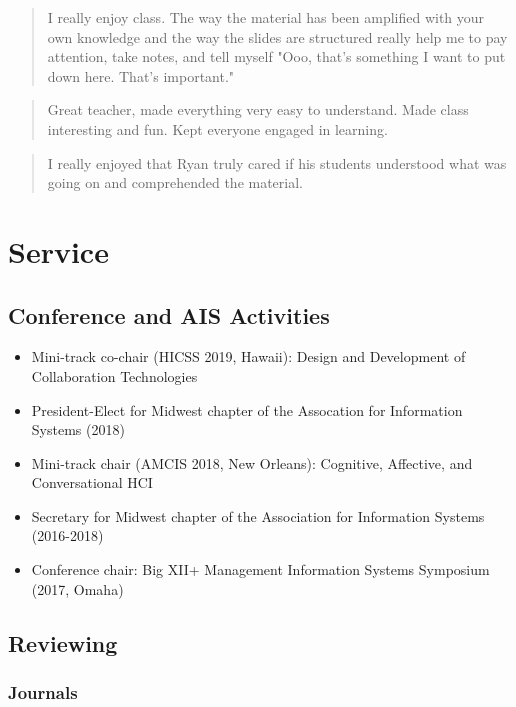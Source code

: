 \documentclass[10pt, letter]{article}
\begin{document}
\begin{quote}
  I really enjoy class. The way the material has been amplified with your own knowledge
  and the way the slides are structured really help me to pay attention, take notes, and
  tell myself "Ooo, that's something I want to put down here. That's important."
\end{quote}

\begin{quote}
  Great teacher, made everything very easy to understand. Made class interesting and
  fun. Kept everyone engaged in learning.
\end{quote}

\begin{quote}
  I really enjoyed that Ryan truly cared if his students understood what was going on and
  comprehended the material.
\end{quote}

\section*{Service}

\subsection*{Conference and AIS Activities}

\begin{itemize}
\itemsep0em
\item Mini-track co-chair (HICSS 2019, Hawaii): Design and Development of Collaboration Technologies
\item President-Elect for Midwest chapter of the Assocation for Information Systems (2018)
\item Mini-track chair (AMCIS 2018, New Orleans): Cognitive, Affective, and Conversational HCI
\item Secretary for Midwest chapter of the Association for Information Systems (2016-2018)
\item Conference chair: Big XII+ Management Information Systems Symposium (2017, Omaha)
\end{itemize}

\subsection*{Reviewing}

\subsubsection*{Journals}
\end{document}
